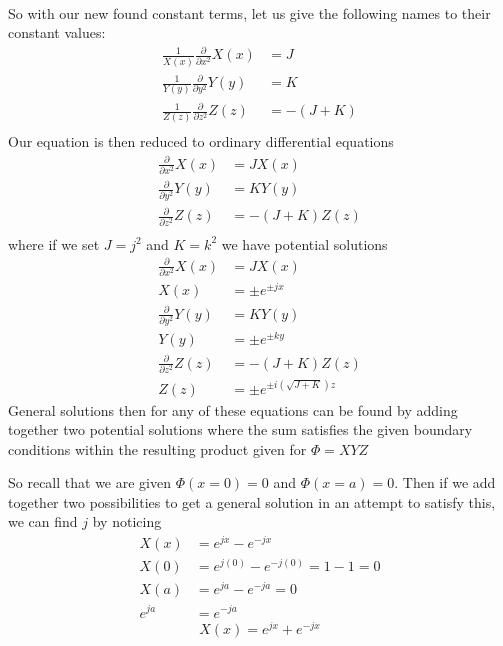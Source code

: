 \documentclass{article}
\begin{document}
\paragraph{}
So with our new found constant terms, let us give the following names to their constant values:
\begin{align*}
\frac{1}{X(x)}\frac{\partial}{\partial x^{2}}X(x) &= J\\
\frac{1}{Y(y)}\frac{\partial}{\partial y^{2}}Y(y) &= K\\
\frac{1}{Z(z)}\frac{\partial}{\partial z^{2}}Z(z) &= -(J+K)\\
\end{align*}
Our equation is then reduced to ordinary differential equations
\begin{align*}
\frac{\partial}{\partial x^{2}}X(x) &= J X(x)\\
\frac{\partial}{\partial y^{2}}Y(y) &= K Y(y)\\
\frac{\partial}{\partial z^{2}}Z(z) &= -(J+K) Z(z)\\
\end{align*}
where if we set $J=j^{2}$ and $K=k^{2}$ we have potential solutions
\begin{align*}
\frac{\partial}{\partial x^{2}}X(x) &= J X(x)\\
X(x) &= \pm e^{\pm jx}\\
\frac{\partial}{\partial y^{2}}Y(y) &= K Y(y)\\
Y(y) &= \pm e^{\pm ky}\\
\frac{\partial}{\partial z^{2}}Z(z) &= -(J+K) Z(z)\\
Z(z) &= \pm e^{\pm i(\sqrt{J+K})z}
\end{align*}
General solutions then for any of these equations can be found by adding together two potential solutions where the sum satisfies the given boundary conditions within the resulting product given for $\Phi=XYZ$

So recall that we are given $\Phi(x=0)=0$ and $\Phi(x=a)=0$. Then if we add together two possibilities to get a general solution in an attempt to satisfy this, we can find $j$ by noticing
\begin{align*}
X(x) &= e^{jx} - e^{-jx}\\
X(0) &= e^{j(0)} - e^{-j(0)} = 1-1 = 0\\
X(a) &= e^{ja} - e^{-ja} = 0\\
e^{ja} &= e^{-ja}
\end{align*}
\[ X(x) = e^{jx} + e^{-jx} \]
\end{document}
